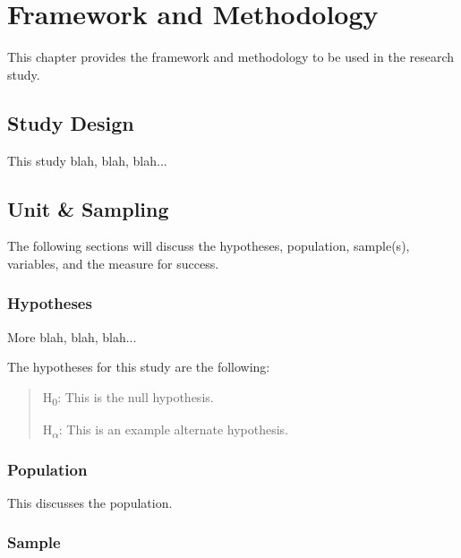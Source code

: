 %
%

\chapter{Framework and Methodology}

This chapter provides the framework and methodology to be used in the research study.

\section{Study Design}

This study blah, blah, blah...


\section{Unit \& Sampling}

The following sections will discuss the hypotheses, population, sample(s), variables, and the measure for success.

\subsection{Hypotheses}

More blah, blah, blah...

The hypotheses for this study are the following:

\begin{quote}
H\textsubscript{0}: This is the null hypothesis.

H\textsubscript{$\alpha$}: This is an example alternate hypothesis.
\end{quote}


\subsection{Population}

This discusses the population.


\subsection{Sample}

